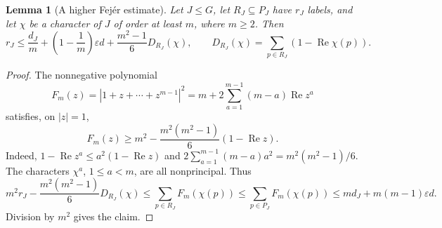 \documentclass[11pt,a4paper]{article}
\newtheorem{lemma}[theorem]{Lemma}
\theoremstyle{definition}
\theoremstyle{remark}
\begin{document}
\begin{lemma}[A higher Fej\'er estimate]\label{p-lem:higher-fejer}
Let $J\leq G$, let $R_J\subseteq P_J$ have $r_J$ labels, and let $\chi$
be a character of $J$ of order at least $m$, where $m\geq2$. Then
\begin{equation}\label{p-eq:ad-fejer}
 r_J\leq\frac{d_J}{m}
       +\left(1-\frac1m\right)\varepsilon d
       +\frac{m^2-1}{6}D_{R_J}(\chi),
 \qquad
 D_{R_J}(\chi)=\sum_{p\in R_J}(1-\operatorname{Re}\chi(p)).
\end{equation}
\end{lemma}
\begin{proof}
The nonnegative polynomial
\[
 F_m(z)=|1+z+\cdots+z^{m-1}|^2
       =m+2\sum_{a=1}^{m-1}(m-a)\operatorname{Re}z^a
\]
satisfies, on $|z|=1$,
\[
 F_m(z)\geq m^2-\frac{m^2(m^2-1)}6(1-\operatorname{Re}z).
\]
Indeed, $1-\operatorname{Re}z^a\leq a^2(1-\operatorname{Re}z)$ and
$2\sum_{a=1}^{m-1}(m-a)a^2=m^2(m^2-1)/6$.
The characters $\chi^a$, $1\leq a<m$, are all nonprincipal. Thus
\[
 m^2r_J-\frac{m^2(m^2-1)}6 D_{R_J}(\chi)
 \leq\sum_{p\in R_J}F_m(\chi(p))
 \leq\sum_{p\in P_J}F_m(\chi(p))
 \leq m d_J+m(m-1)\varepsilon d.
\]
Division by $m^2$ gives the claim.
\end{proof}
\end{document}
